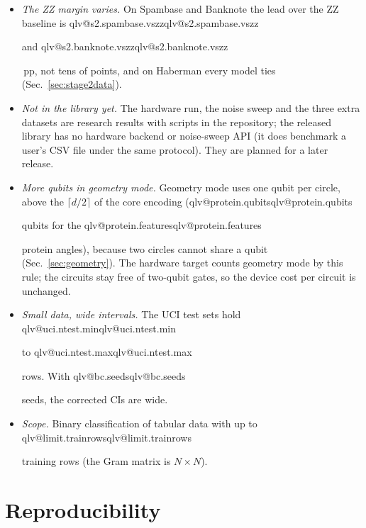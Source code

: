 \documentclass[aps,pra,reprint,superscriptaddress,nofootinbib,longbibliography]{revtex4-2}
\makeatletter
\newcommand{\val}[1]{\ifcsname qlv@#1\endcsname\csname qlv@#1\endcsname\else
  \PackageError{qlassifier}{No value '#1'}{Run python scripts/paper_tables.py}\fi}
\newcommand{\pp}{\,pp}
\makeatother
\begin{document}
\begin{itemize}
  loss under device models is \val{sweep.fqk.drop0}\pp\ with device noise off (Sec.~\ref{sec:sweep}); Qlassifier's advantage
  over it comes from shot efficiency: three settings per sample instead of one fidelity per pair.
\item \textit{The ZZ margin varies.} On Spambase and Banknote the lead over the ZZ baseline is \val{s2.spambase.vszz}
  and \val{s2.banknote.vszz}\pp, not tens of points, and on Haberman every model ties (Sec.~\ref{sec:stage2data}).
\item \textit{Not in the library yet.} The hardware run, the noise sweep and the three extra datasets are research
  results with scripts in the repository; the released library has no hardware backend or noise-sweep API (it does
  benchmark a user's CSV file under the same protocol). They are planned for a later release.
\item \textit{More qubits in geometry mode.} Geometry mode uses one qubit per circle, above the $\lceil d/2 \rceil$
  of the core encoding (\val{protein.qubits} qubits for the \val{protein.features} protein angles), because two
  circles cannot share a qubit (Sec.~\ref{sec:geometry}). The hardware target counts geometry mode by this rule;
  the circuits stay free of two-qubit gates, so the device cost per circuit is unchanged.
\item \textit{Small data, wide intervals.} The UCI test sets hold \val{uci.ntest.min} to \val{uci.ntest.max} rows. With \val{bc.seeds} seeds, the
  corrected CIs are wide.
\item \textit{Scope.} Binary classification of tabular data with up to \val{limit.trainrows} training rows (the Gram
  matrix is $N \times N$).
\end{itemize}

\section{Reproducibility}
\label{sec:repro}
\end{document}
